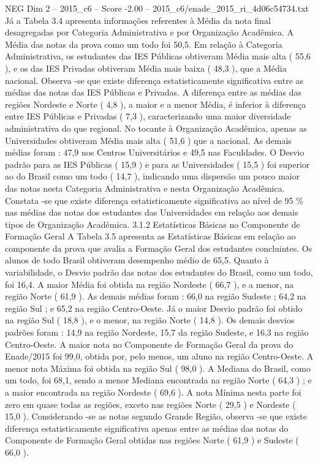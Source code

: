 \begin{textsample}{NEG Dim 2 – 2015\_c6 – Score -2.00 – 2015\_c6/enade\_2015\_ri\_4d06c54734.txt}
Já a Tabela 3.4 apresenta informações referentes à Média da nota final desagregadas por Categoria Administrativa e por Organização Acadêmica.
A Média das notas da prova como um todo foi 50,5.
Em relação à Categoria Administrativa, os estudantes das IES Públicas obtiveram Média mais alta ( 55,6 ), e os das IES Privadas obtiveram Média mais baixa ( 48,3 ), que a Média nacional.
Observa -se que existe diferença estatisticamente significativa entre as médias das notas das IES Públicas e Privadas.
A diferença entre as médias das regiões Nordeste e Norte ( 4,8 ), a maior e a menor Média, é inferior à diferença entre IES Públicas e Privadas ( 7,3 ), caracterizando uma maior diversidade administrativa do que regional.
No tocante à Organização Acadêmica, apenas as Universidades obtiveram Média mais alta ( 51,6 ) que a nacional.
As demais médias foram : 47,9 nos Centros Universitários e 49,5 nas Faculdades.
O Desvio padrão para as IES Públicas ( 15,9 ) e para as Universidades ( 15,5 ) foi superior ao do Brasil como um todo ( 14,7 ), indicando uma dispersão um pouco maior das notas nesta Categoria Administrativa e nesta Organização Acadêmica.
Constata -se que existe diferença estatisticamente significativa ao nível de 95 \% nas médias das notas dos estudantes das Universidades em relação aos demais tipos de Organização Acadêmica. 3.1.2 Estatísticas Básicas no Componente de Formação Geral A Tabela 3.5 apresenta as Estatísticas Básicas em relação ao componente da prova que avalia a Formação Geral dos estudantes concluintes.
Os alunos de todo Brasil obtiveram desempenho médio de 65,5.
Quanto à variabilidade, o Desvio padrão das notas dos estudantes do Brasil, como um todo, foi 16,4.
A maior Média foi obtida na região Nordeste ( 66,7 ), e a menor, na região Norte ( 61,9 ).
As demais médias foram : 66,0 na região Sudeste ; 64,2 na região Sul ; e 65,2 na região Centro-Oeste.
Já o maior Desvio padrão foi obtido na região Sul ( 18,8 ), e o menor, na região Norte ( 14,8 ).
Os demais desvios padrões foram : 14,9 na região Nordeste, 15,7 da região Sudeste, e 16,3 na região Centro-Oeste.
A maior nota no Componente de Formação Geral da prova do Enade/2015 foi 99,0, obtida por, pelo menos, um aluno na região Centro-Oeste.
A menor nota Máxima foi obtida na região Sul ( 98,0 ).
A Mediana do Brasil, como um todo, foi 68,1, sendo a menor Mediana encontrada na região Norte ( 64,3 ) ; e a maior encontrada na região Nordeste ( 69,6 ).
A nota Mínima nesta parte foi zero em quase todas as regiões, exceto nas regiões Norte ( 29,5 ) e Nordeste ( 15,0 ).
Considerando -se as notas segundo Grande Região, observa -se que existe diferença estatisticamente significativa apenas entre as médias das notas do Componente de Formação Geral obtidas nas regiões Norte ( 61,9 ) e Sudeste ( 66,0 ).

\end{textsample}
